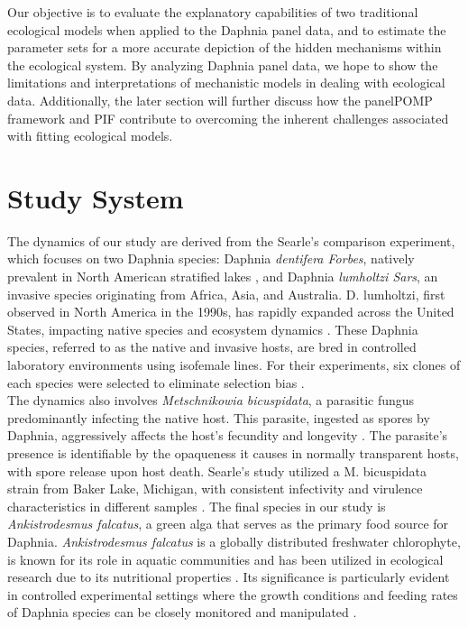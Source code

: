 \documentclass[12pt]{article}
\begin{document}
Our objective is to evaluate the explanatory capabilities of two traditional ecological models when applied to the Daphnia panel data, and to estimate the parameter sets for a more accurate depiction of the hidden mechanisms within the ecological system. By analyzing Daphnia panel data, we hope to show the limitations and interpretations of mechanistic models in dealing with ecological data. Additionally, the later section will further discuss how the panelPOMP framework and PIF contribute to overcoming the inherent challenges associated with fitting ecological models.


\section{Study System}
\label{sec:studysystem}

The dynamics of our study are derived from the Searle's comparison experiment, which focuses on two Daphnia species: Daphnia \textit{dentifera Forbes}, natively prevalent in North American stratified lakes \cite{searle2016salinization}, and Daphnia \textit{lumholtzi Sars}, an invasive species originating from Africa, Asia, and Australia. D. lumholtzi, first observed in North America in the 1990s, has rapidly expanded across the United States, impacting native species and ecosystem dynamics \cite{havel1993daphnia}. These Daphnia species, referred to as the native and invasive hosts, are bred in controlled laboratory environments using isofemale lines. For their experiments, six clones of each species were selected to eliminate selection bias \cite{Searle2016}.\\ 

The dynamics also involves \textit{Metschnikowia bicuspidata}, a parasitic fungus predominantly infecting the native host. This parasite, ingested as spores by Daphnia, aggressively affects the host's fecundity and longevity \cite{duffy2010temporal}. The parasite's presence is identifiable by the opaqueness it causes in normally transparent hosts, with spore release upon host death. Searle's study utilized a M. bicuspidata strain from Baker Lake, Michigan, with consistent infectivity and virulence characteristics in different samples \cite{Searle2016}. The final species in our study is \textit{Ankistrodesmus falcatus}, a green alga that serves as the primary food source for Daphnia. \textit{Ankistrodesmus falcatus} is a globally distributed freshwater chlorophyte, is known for its role in aquatic communities and has been utilized in ecological research due to its nutritional properties \cite{arnold1971ingestion}. Its significance is particularly evident in controlled experimental settings where the growth conditions and feeding rates of Daphnia species can be closely monitored and manipulated \cite{martinez1994effect}.\\
\end{document}
